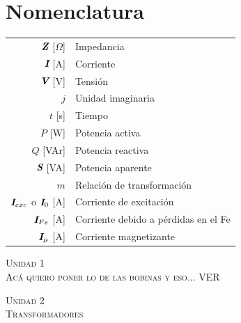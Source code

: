 \documentclass[11pt,a4paper,twocolumn]{article}
\newcommand{\fasor}[1]{\uppercase{\textit{\textbf{#1}}}}
\newcommand{\unidad}[2]{\begin{center}
		\fontsize{10}{10}\selectfont\color{gray!50!black}\scshape Unidad #1 \\
		\fontsize{14}{14}\selectfont \scshape #2
\end{center} \vspace{-.6cm}}
\begin{document}
    \pagestyle{fancy}
    \section*{Nomenclatura}
    \begin{tabular}{r l}
		$\fasor{Z}$ [$\Omega$]& Impedancia \\
		$\fasor{i}$ [A] & Corriente \\
		$\fasor{v}$ [V] & Tensión\\
		$j$ & Unidad imaginaria \\
		$t$ [s] & Tiempo \\
		$P$ [W] & Potencia activa \\
		$Q$ [VAr] & Potencia reactiva \\
		$\fasor{s}$ [VA] & Potencia aparente \\
        $m$ & Relación de transformación\\
        $\fasor{I}_{exc}$ o $\fasor{I}_0$ [A] & Corriente de excitación\\
        $\fasor{I}_{Fe}$ [A] & Corriente debido a pérdidas en el Fe\\
        $\fasor{I}_{\mu}$ [A] & Corriente magnetizante\\
	\end{tabular}
    \unidad{1}{Acá quiero poner lo de las bobinas y eso... VER}
    \unidad{2}{Transformadores}
\end{document}
